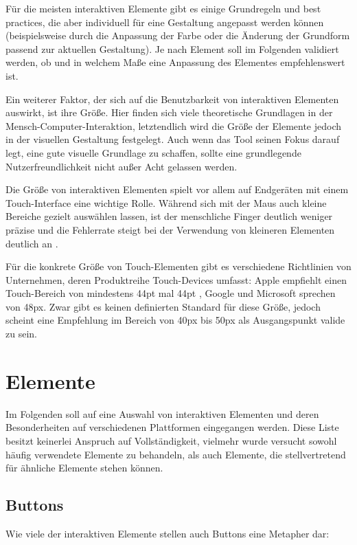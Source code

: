 Für die meisten interaktiven Elemente gibt es einige Grundregeln und best practices, die aber individuell für eine Gestaltung angepasst werden können (beispielsweise durch die Anpassung der Farbe oder die Änderung der Grundform passend zur aktuellen Gestaltung).
Je nach Element soll im Folgenden validiert werden, ob und in welchem Maße eine Anpassung des Elementes empfehlenswert ist.

Ein weiterer Faktor, der sich auf die Benutzbarkeit von interaktiven Elementen auswirkt, ist ihre Größe. Hier finden sich viele theoretische Grundlagen in der Mensch-Computer-Interaktion, letztendlich wird die Größe der Elemente jedoch in der visuellen Gestaltung festgelegt. Auch wenn das Tool seinen Fokus darauf legt, eine gute visuelle Grundlage zu schaffen, sollte eine grundlegende Nutzerfreundlichkeit nicht außer Acht gelassen werden.

Die Größe von interaktiven Elementen spielt vor allem auf Endgeräten mit einem Touch-Interface eine wichtige Rolle. Während sich mit der Maus auch kleine Bereiche gezielt auswählen lassen, ist der menschliche Finger deutlich weniger präzise und die Fehlerrate steigt bei der Verwendung von kleineren Elementen deutlich an \cite{park2008touch}.

Für die konkrete Größe von Touch-Elementen gibt es verschiedene Richtlinien von Unternehmen, deren Produktreihe Touch-Devices umfasst:
Apple empfiehlt einen Touch-Bereich von mindestens 44pt mal 44pt \cite{apple2016layout}, Google \cite{google2016tap} und Microsoft \cite{microsoft2016traget} sprechen von 48px. Zwar gibt es keinen definierten Standard für diese Größe, jedoch scheint eine Empfehlung im Bereich von 40px bis 50px als Ausgangspunkt valide zu sein.

\section{Elemente}
Im Folgenden soll auf eine Auswahl von interaktiven Elementen und deren Besonderheiten auf verschiedenen Plattformen eingegangen werden. Diese Liste besitzt keinerlei Anspruch auf Vollständigkeit, vielmehr wurde versucht sowohl häufig verwendete Elemente zu behandeln, als auch Elemente, die stellvertretend für ähnliche Elemente stehen können.

\subsection{Buttons}

Wie viele der interaktiven Elemente stellen auch Buttons eine Metapher dar:

